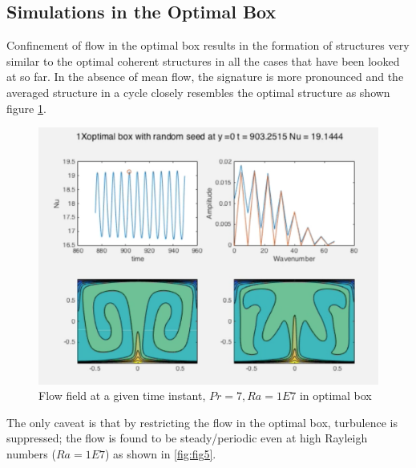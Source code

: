 \documentclass[12pt]{article}
\begin{document}
      \subsection{Simulations in the Optimal Box}
      
      Confinement of flow in the optimal box results in the formation of structures very similar to the optimal coherent structures in all the cases that have been looked at so far. In the absence of mean flow, the signature is more pronounced and the averaged structure in a cycle closely resembles the optimal structure as shown figure \ref{fig:fig3}.
      
      \begin{figure}[!htb]
      	\includegraphics[width=\linewidth]{1E7opt.png}
      	\caption{Flow field at a given time instant, $Pr = 7, Ra = 1E7$ in optimal box}
      	\label{fig:fig3}
      \end{figure}
      
      
      The only caveat is that by restricting the flow in the optimal box, turbulence is suppressed; the flow is found to be steady/periodic even at high Rayleigh numbers ($Ra = 1E7$) as shown in \ref{fig:fig5}.
      
\end{document}
